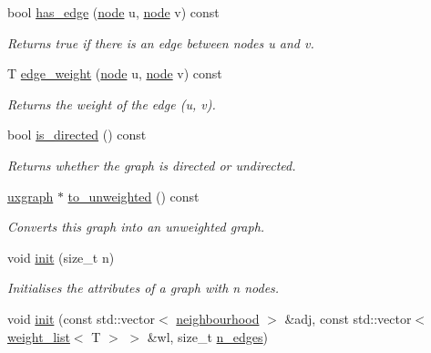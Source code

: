 \begin{DoxyCompactItemize}
bool \hyperlink{classlgraph_1_1wugraph_a071da5745521c264453fb76218057c87}{has\-\_\-edge} (\hyperlink{namespacelgraph_a397169dd66adf725210a30fb7251773e}{node} u, \hyperlink{namespacelgraph_a397169dd66adf725210a30fb7251773e}{node} v) const 
\begin{DoxyCompactList}\small\item\em Returns true if there is an edge between nodes {\itshape u} and {\itshape v}. \end{DoxyCompactList}\item 
T \hyperlink{classlgraph_1_1wugraph_ad149f5eec6542450d780cd1680c9fe17}{edge\-\_\-weight} (\hyperlink{namespacelgraph_a397169dd66adf725210a30fb7251773e}{node} u, \hyperlink{namespacelgraph_a397169dd66adf725210a30fb7251773e}{node} v) const 
\begin{DoxyCompactList}\small\item\em Returns the weight of the edge ({\itshape u}, {\itshape v}). \end{DoxyCompactList}\item 
bool \hyperlink{classlgraph_1_1wugraph_a7b046b2da62a0d9c26e6ec697152aea7}{is\-\_\-directed} () const 
\begin{DoxyCompactList}\small\item\em Returns whether the graph is directed or undirected. \end{DoxyCompactList}\item 
\hyperlink{classlgraph_1_1uxgraph}{uxgraph} $\ast$ \hyperlink{classlgraph_1_1wugraph_a7dfc44ce463dbbe1404127fb9331f5f5}{to\-\_\-unweighted} () const 
\begin{DoxyCompactList}\small\item\em Converts this graph into an unweighted graph. \end{DoxyCompactList}\item 
void \hyperlink{classlgraph_1_1wxgraph_aa09f37bf4a34a0f4f002587203df0125}{init} (size\-\_\-t n)
\begin{DoxyCompactList}\small\item\em Initialises the attributes of a graph with {\itshape n} nodes. \end{DoxyCompactList}\item 
void \hyperlink{classlgraph_1_1wxgraph_a851ab43d7658c185831413394ef915a9}{init} (const std\-::vector$<$ \hyperlink{namespacelgraph_a052e7766c13f3a43cec0aec8173fdede}{neighbourhood} $>$ \&adj, const std\-::vector$<$ \hyperlink{namespacelgraph_a1e0fd5ef0a78b2a92da48adbed265cb6}{weight\-\_\-list}$<$ T $>$ $>$ \&wl, size\-\_\-t \hyperlink{classlgraph_1_1xxgraph_a8ca991d1521cb6ba77e1cd3494ab42be}{n\-\_\-edges})

\end{DoxyCompactItemize}
